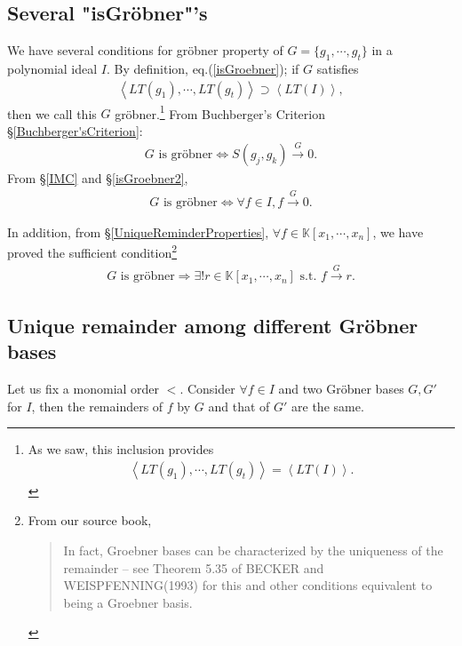 \documentclass[11pt]{book}
\begin{document}
\subsection{Several "isGr\"obner"'s}
\label{severalIsGroebner}
We have several conditions for gr\"obner property of $G = \{g_1, \cdots, g_t\}$ in a polynomial ideal $I$.
By definition, eq.(\ref{isGroebner}); if $G$ satisfies
\begin{eqnarray}
\nonumber
\left< LT(g_1), \cdots, LT(g_t) \right> \supset \left< LT(I) \right>,
\end{eqnarray}
then we call this $G$ gr\"obner.\footnote{As we saw, this inclusion provides
\begin{eqnarray}
\nonumber
\left< LT(g_1), \cdots, LT(g_t) \right> = \left< LT(I) \right>.
\end{eqnarray}
}
From Buchberger's Criterion \S\ref{Buchberger'sCriterion}:
\begin{eqnarray}
\nonumber
\text{$G$ is gr\"obner}\Leftrightarrow S(g_j, g_k) \stackrel{G}{\to} 0.
\end{eqnarray}
From \S\ref{IMC} and \S\ref{isGroebner2},
\begin{eqnarray}
\text{$G$ is gr\"obner}\Leftrightarrow \forall f \in I, f \stackrel{G}{\to} 0.
\end{eqnarray}

In addition, from \S\ref{UniqueReminderProperties}, $\forall f \in \mathbb{K}[x_1, \cdots, x_n]$, we have proved the sufficient condition\footnote{From our source book,
\begin{quote}
In fact, Groebner bases can be characterized by the uniqueness of the remainder -- see Theorem 5.35 of BECKER and WEISPFENNING(1993) for this and other conditions equivalent to being a Groebner basis.
\end{quote}
}
\begin{eqnarray}
\nonumber
\text{$G$ is gr\"obner}\Rightarrow \exists! r \in \mathbb{K}[x_1, \cdots, x_n] \text{ s.t. } f \stackrel{G}{\to} r.
\end{eqnarray}

\subsection{Unique remainder among different Gr\"obner bases}
%
%
%
Let us fix a monomial order $<$.
Consider $\forall f \in I$ and two Gr\"obner bases $G, G'$ for $I$, then the remainders of $f$ by $G$ and that of $G'$ are the same.
\end{document}
